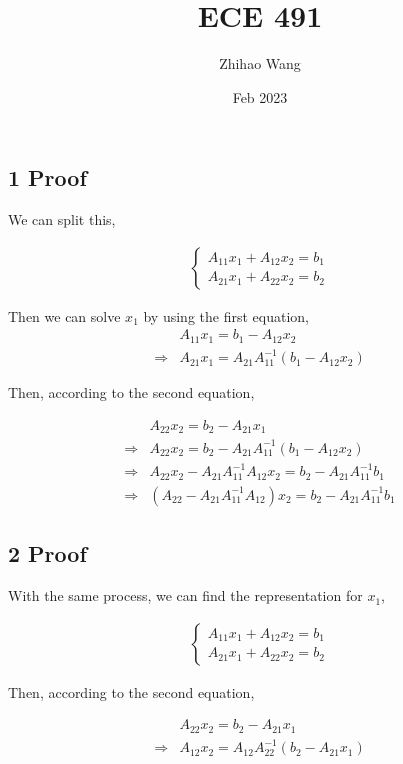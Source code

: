 \documentclass{article}
\title{ECE 491}
\author{Zhihao Wang}
\date{Feb 2023}
\def\implies{\Longrightarrow}
\begin{document}
\maketitle

\subsection*{1 Proof}

We can split this, 

\[
\begin{split}
\begin{cases}
A_{11}x_1 + A_{12}x_2 = b_1 \\
A_{21}x_1 + A_{22}x_2 = b_2 
\end{cases}
\end{split}
\]


Then we can solve $x_1$ by using the first equation,
\[
\begin{split}
 & A_{11}x_1 = b_1 - A_{12}x_2 \\
 \implies & A_{21}x_1 = A_{21}A_{11}^{-1}(b_1 - A_{12}x_2)
\end{split}
\]

Then, according to the second equation,

\[
\begin{split}
 & A_{22}x_2 = b_2 - A_{21}x_1 \\
 \implies & A_{22}x_2 = b_2 - A_{21}A_{11}^{-1}(b_1 - A_{12}x_2) \\
 \implies & A_{22}x_2 - A_{21}A_{11}^{-1}A_{12}x_2 = b_2 -  A_{21}A_{11}^{-1}b_1 \\
 \implies & (A_{22} - A_{21}A_{11}^{-1}A_{12})x_2 = b_2 -  A_{21}A_{11}^{-1}b_1 
\end{split}
\]

\subsection*{2 Proof}

With the same process, we can find the representation for $x_1$,

\[
\begin{split}
\begin{cases}
A_{11}x_1 + A_{12}x_2 = b_1 \\
A_{21}x_1 + A_{22}x_2 = b_2 
\end{cases}
\end{split}
\]

Then, according to the second equation,

\[
\begin{split}
 & A_{22}x_2 = b_2 -  A_{21}x_1\\
 \implies & A_{12}x_2 = A_{12}A_{22}^{-1}(b_2 - A_{21}x_1)
\end{split}
\]
\end{document}
